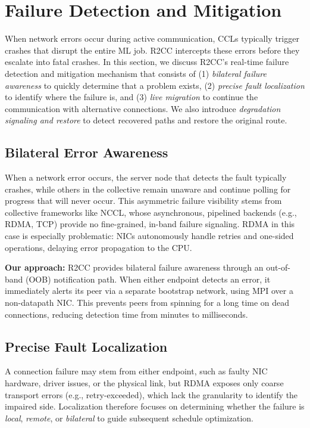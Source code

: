 \section{Failure Detection and Mitigation}\label{sec:design-mig}

When network errors occur during active communication, CCLs typically trigger crashes that disrupt the entire ML job. R2CC intercepts these errors before they escalate into fatal crashes. In this section, we discuss R2CC's real-time failure detection and mitigation mechanism that consists of
(1) \textit{bilateral failure awareness} to quickly determine that a problem exists, (2) \textit{precise fault localization} to identify where the failure is, and (3) \textit{live migration} to continue the communication with alternative connections. We also introduce \textit{degradation signaling and restore} to detect recovered paths and restore the original route.

\subsection{Bilateral Error Awareness}

When a network error occurs, the server node that detects the fault typically crashes, while others in the collective remain unaware and continue polling for progress that will never occur. This asymmetric failure visibility stems from collective frameworks like NCCL, whose asynchronous, pipelined backends (e.g., RDMA, TCP) provide no fine-grained, in-band failure signaling. RDMA in this case is especially problematic: NICs autonomously handle retries and one-sided operations, delaying error propagation to the CPU.

\smallskip\textbf{Our approach:} R2CC provides bilateral failure awareness through an out-of-band (OOB) notification path. When either endpoint detects an error, it immediately alerts its peer via a separate bootstrap network, using MPI over a non-datapath NIC. This prevents peers from spinning for a long time on dead connections, reducing detection time from minutes to milliseconds.

\subsection{Precise Fault Localization}
A connection failure may stem from either endpoint, such as faulty NIC hardware, driver issues, or the physical link, but RDMA exposes only coarse transport errors (e.g., retry-exceeded), which lack the granularity to identify the impaired side. Localization therefore focuses on determining whether the failure is \textit{local}, \textit{remote}, or \textit{bilateral} to guide subsequent schedule optimization. 

